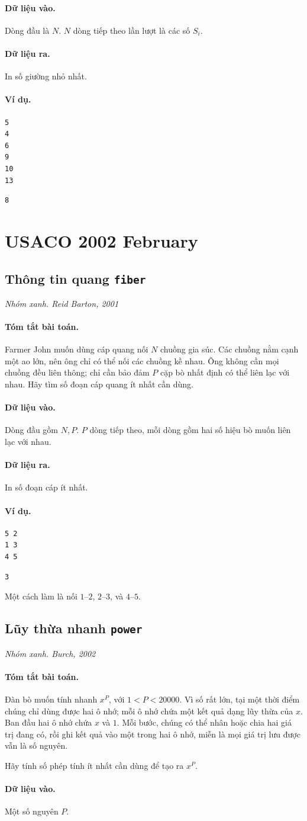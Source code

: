 \documentclass[11pt]{article}
\newcommand{\problem}[4]{%
  \subsection[#1 (#2)]{#1 \hfill {\normalsize\texttt{#2}}}%
  \noindent\textit{#3. #4}\par\smallskip
}
\newcommand{\iosec}[1]{\paragraph{#1}}
\begin{document}
\iosec{Dữ liệu vào.}
Dòng đầu là \(N\). \(N\) dòng tiếp theo lần lượt là các số \(S_i\).

\iosec{Dữ liệu ra.}
In số giường nhỏ nhất.

\iosec{Ví dụ.}
\begin{verbatim}
5
4
6
9
10
13
\end{verbatim}

\begin{verbatim}
8
\end{verbatim}

\section{USACO 2002 February}

\problem{Thông tin quang}{fiber}{Nhóm xanh}{Reid Barton, 2001}

\iosec{Tóm tắt bài toán.}
Farmer John muốn dùng cáp quang nối \(N\) chuồng gia súc. Các chuồng nằm cạnh
một ao lớn, nên ông chỉ có thể nối các chuồng kề nhau. Ông không cần mọi
chuồng đều liên thông; chỉ cần bảo đảm \(P\) cặp bò nhất định có thể liên lạc
với nhau. Hãy tìm số đoạn cáp quang ít nhất cần dùng.

\iosec{Dữ liệu vào.}
Dòng đầu gồm \(N,P\). \(P\) dòng tiếp theo, mỗi dòng gồm hai số hiệu bò muốn
liên lạc với nhau.

\iosec{Dữ liệu ra.}
In số đoạn cáp ít nhất.

\iosec{Ví dụ.}
\begin{verbatim}
5 2
1 3
4 5
\end{verbatim}

\begin{verbatim}
3
\end{verbatim}

Một cách làm là nối \(1\)--\(2\), \(2\)--\(3\), và \(4\)--\(5\).

\problem{Lũy thừa nhanh}{power}{Nhóm xanh}{Burch, 2002}

\iosec{Tóm tắt bài toán.}
Đàn bò muốn tính nhanh \(x^P\), với \(1<P<20000\). Vì số rất lớn, tại một thời
điểm chúng chỉ dùng được hai ô nhớ; mỗi ô nhớ chứa một kết quả dạng lũy thừa
của \(x\). Ban đầu hai ô nhớ chứa \(x\) và \(1\). Mỗi bước, chúng có thể nhân
hoặc chia hai giá trị đang có, rồi ghi kết quả vào một trong hai ô nhớ, miễn
là mọi giá trị lưu được vẫn là số nguyên.

Hãy tính số phép tính ít nhất cần dùng để tạo ra \(x^P\).

\iosec{Dữ liệu vào.}
Một số nguyên \(P\).
\end{document}
